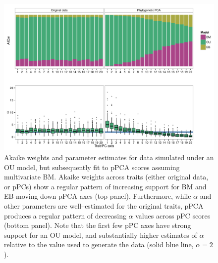 \documentclass[a4paper,12pt]{article}
\begin{document}
\begin{figure}[p]
\centering
\includegraphics[scale=0.6]{./fig/model-support-alpha.pdf}
\caption{Akaike weights and parameter estimates for data simulated under an OU model, but subsequently fit to pPCA scores assuming multivariate BM. Akaike weights across traits (either original data, or pPCs) show a regular pattern of increasing support for BM and EB  moving down pPCA axes (top panel). Furthermore, while $\alpha$ and other parameters are well--estimated for the original traits, pPCA produces a regular pattern of decreasing $\alpha$ values across pPC scores (bottom panel). Note that the first few pPC axes have strong support for an OU model, and substantially higher estimates of $\alpha$ relative to the value used to generate the data (solid blue line, $\alpha = 2$).}
\label{oufit}
\end{figure}
\end{document}
